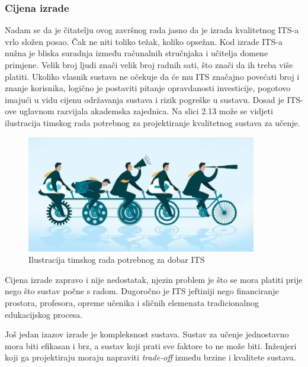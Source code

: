 \documentclass[times, utf8, zavrsni, numeric]{fer}
\begin{document}
\subsubsection{Cijena izrade}
Nadam se da je čitatelju ovog završnog rada jasno da je izrada kvalitetnog ITS-a vrlo složen posao. Čak ne niti toliko težak, koliko opsežan. Kod izrade ITS-a nužna je bliska suradnja između računalnih stručnjaka i učitelja domene primjene. Velik broj ljudi znači velik broj radnih sati, što znači da ih treba više platiti. Ukoliko vlasnik sustava ne očekuje da će mu ITS značajno povećati broj i znanje korisnika, logično je postaviti pitanje opravdanosti investicije, pogotovo imajući u vidu cijenu održavanja sustava i rizik pogreške u sustavu. Dosad je ITS-ove uglavnom razvijala akademska zajednica. Na slici 2.13 može se vidjeti ilustracija timskog rada potrebnog za projektiranje kvalitetnog sustava za učenje.

\begin{figure}[htb]
	\centering
	\includegraphics[]{img/teamwork.jpg}
	\caption{Ilustracija timskog rada potrebnog za dobar ITS\citep{teamwork}}
	\label{fig:teamwork}
\end{figure}

\par
Cijena izrade zapravo i nije nedostatak, njezin problem je što se mora platiti prije nego što sustav počne s radom. Dugoročno je ITS jeftiniji nego financiranje prostora, profesora, opreme učenika i sličnih elemenata tradicionalnog edukacijskog procesa.\citep{limitations}
\par
Još jedan izazov izrade je kompleksnost sustava. Sustav za učenje jednostavno mora biti efikasan i brz, a sustav koji prati sve faktore to ne može biti. Inženjeri koji ga projektiraju moraju napraviti \textit{trade-off} između brzine i kvalitete sustava.
\end{document}
